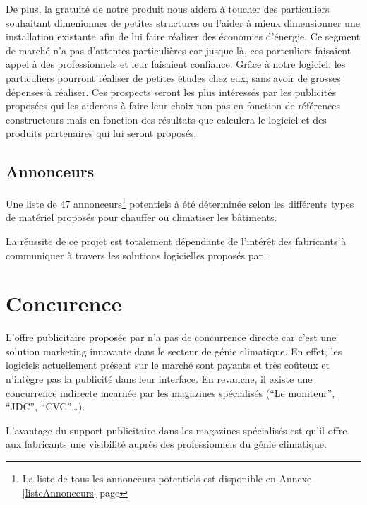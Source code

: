 		De plus, la gratuité de notre produit nous aidera à toucher des particuliers souhaitant
		dimenionner de petites structures ou l'aider à mieux dimensionner une installation existante
		afin de lui faire réaliser des économies d'énergie. Ce segment de marché n'a pas d'attentes particulières
		car jusque là, ces partculiers faisaient appel à des professionnels et leur faisaient confiance. Grâce à notre
		logiciel, les particuliers pourront réaliser de petites études chez eux, sans avoir de grosses dépenses
		à réaliser. Ces prospects seront les plus intéressés par les publicités proposées qui les aiderons
		à faire leur choix non pas en fonction de références constructeurs mais en fonction des résultats que calculera le
		logiciel et des produits partenaires qui lui seront proposés.

		\subsection{Annonceurs}
			Une liste de 47 annonceurs\footnote{La liste de tous les annonceurs potentiels est disponible en Annexe \ref{listeAnnonceurs} page \pageref{listeAnnonceurs}}  
			potentiels à été déterminée selon les différents types de matériel proposés 
			pour chauffer ou climatiser les bâtiments.

			La réussite de ce projet est totalement dépendante de l'intérêt des fabricants à communiquer à travers les solutions logicielles proposés par \K{}.
		
	
	\section{Concurence}\label{concurence}
	L'offre publicitaire proposée par \K{} n'a pas de concurrence directe
	car c'est une solution marketing innovante dans le secteur de génie
	climatique. En effet, les logiciels actuellement
	présent sur le marché sont payants et très coûteux et n'intègre pas la
	publicité dans leur interface.
	En revanche, il existe une concurrence indirecte incarnée par les
	magazines spécialisés (``Le moniteur'', ``JDC'', ``CVC''\ldots).

	L'avantage du support publicitaire dans les magazines spécialisés
	est qu'il offre aux fabricants une visibilité auprès des professionnels
	du génie climatique.

